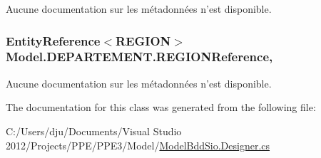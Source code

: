 Aucune documentation sur les métadonnées n'est disponible. 

\hypertarget{class_model_1_1_d_e_p_a_r_t_e_m_e_n_t_a55dd7dbfe43d8c3a15f0a0bef1d2ba20}{
\subsubsection[{R\-E\-G\-I\-O\-N\-Reference}]{\setlength{\rightskip}{0pt plus 5cm}Entity\-Reference$<${\bf R\-E\-G\-I\-O\-N}$>$ Model.\-D\-E\-P\-A\-R\-T\-E\-M\-E\-N\-T.\-R\-E\-G\-I\-O\-N\-Reference\hspace{0.3cm}{\ttfamily [get]}, {\ttfamily [set]}}}\label{class_model_1_1_d_e_p_a_r_t_e_m_e_n_t_a55dd7dbfe43d8c3a15f0a0bef1d2ba20}


Aucune documentation sur les métadonnées n'est disponible. 



The documentation for this class was generated from the following file\-:\begin{DoxyCompactItemize}
\item 
C\-:/\-Users/dju/\-Documents/\-Visual Studio 2012/\-Projects/\-P\-P\-E/\-P\-P\-E3/\-Model/\hyperlink{_model_bdd_sio_8_designer_8cs}{Model\-Bdd\-Sio.\-Designer.\-cs}\end{DoxyCompactItemize}
